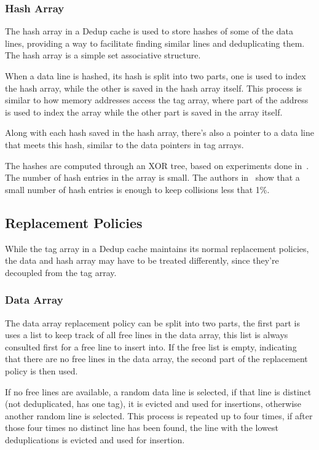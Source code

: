 \subsubsection{Hash Array}
\label{sssec:DedupHash}
The hash array in a Dedup cache is used to store hashes of some of the data lines, providing a way to facilitate finding similar lines and deduplicating them. The hash array is a simple set associative structure.\par
When a data line is hashed, its hash is split into two parts, one is used to index the hash array, while the other is saved in the hash array itself. This process is similar to how memory addresses access the tag array, where part of the address is used to index the array while the other part is saved in the array itself.\par
Along with each hash saved in the hash array, there's also a pointer to a data line that meets this hash, similar to the data pointers in tag arrays.\par
The hashes are computed through an XOR tree, based on experiments done in~\cite{dedup}. The number of hash entries in the array is small. The authors in~\cite{dedup} show that a small number of hash entries is enough to keep collisions less that 1\%.

\subsection{Replacement Policies}
\label{ssec:DedupRepl}
While the tag array in a Dedup cache maintains its normal replacement policies, the data and hash array may have to be treated differently, since they're decoupled from the tag array.
\subsubsection{Data Array}
\label{sssec:DedupDataRepl}
The data array replacement policy can be split into two parts, the first part is uses a list to keep track of all free lines in the data array, this list is always consulted first for a free line to insert into. If the free list is empty, indicating that there are no free lines in the data array, the second part of the replacement policy is then used.\par
If no free lines are available, a random data line is selected, if that line is distinct (not deduplicated, has one tag), it is evicted and used for insertions, otherwise another random line is selected. This process is repeated up to four times, if after those four times no distinct line has been found, the line with the lowest deduplications is evicted and used for insertion.
